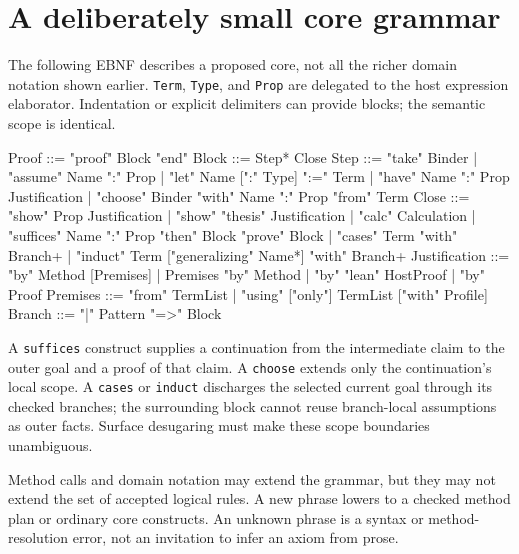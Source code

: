 \documentclass[11pt,a4paper]{article}
\theoremstyle{remark}
\newcommand{\ty}[1]{\texttt{#1}}
\begin{document}
\section{A deliberately small core grammar}\label{app:grammar}
The following EBNF describes a proposed core, not all the richer domain notation shown earlier. \ty{Term}, \ty{Type}, and \ty{Prop} are delegated to the host expression elaborator. Indentation or explicit delimiters can provide blocks; the semantic scope is identical.
\Needspace{262pt}
\begin{code}
Proof       ::= "proof" Block "end"
Block       ::= Step* Close
Step        ::= "take" Binder
              | "assume" Name ":" Prop
              | "let" Name [":" Type] ":=" Term
              | "have" Name ":" Prop Justification
              | "choose" Binder "with" Name ":" Prop "from" Term
Close       ::= "show" Prop Justification
              | "show" "thesis" Justification
              | "calc" Calculation
              | "suffices" Name ":" Prop "then" Block "prove" Block
              | "cases" Term "with" Branch+
              | "induct" Term ["generalizing" Name*] "with" Branch+
Justification ::= "by" Method [Premises]
                | Premises "by" Method
                | "by" "lean" HostProof
                | "by" Proof
Premises    ::= "from" TermList
              | "using" ["only"] TermList ["with" Profile]
Branch      ::= "|" Pattern "=>" Block
\end{code}
A \ty{suffices} construct supplies a continuation from the intermediate claim to the outer goal and a proof of that claim. A \ty{choose} extends only the continuation's local scope. A \ty{cases} or \ty{induct} discharges the selected current goal through its checked branches; the surrounding block cannot reuse branch-local assumptions as outer facts. Surface desugaring must make these scope boundaries unambiguous.

Method calls and domain notation may extend the grammar, but they may not extend the set of accepted logical rules. A new phrase lowers to a checked method plan or ordinary core constructs. An unknown phrase is a syntax or method-resolution error, not an invitation to infer an axiom from prose.

\clearpage
\end{document}
